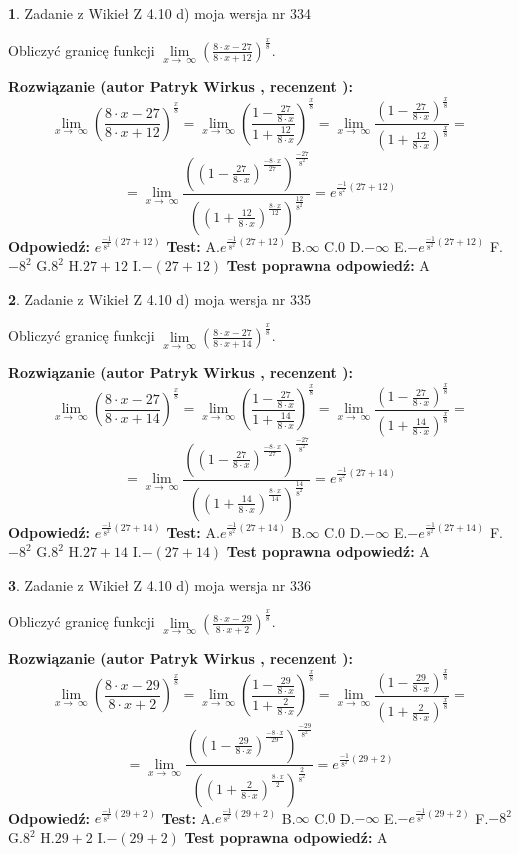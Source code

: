 \documentclass[12pt, a4paper]{article}
\theoremstyle{definition} %
\newtheorem{zad}{}
\newcommand{\zadStart}[1]{\begin{zad}#1\newline}
\newcommand{\zadStop}{\end{zad}}
\newcommand{\rozwStart}[2]{\noindent \textbf{Rozwiązanie (autor #1 , recenzent #2): }\newline}
\newcommand{\rozwStop}{\newline}
\newcommand{\odpStart}{\noindent \textbf{Odpowiedź:}\newline}
\newcommand{\odpStop}{\newline}
\newcommand{\testStart}{\noindent \textbf{Test:}\newline}
\newcommand{\testStop}{\newline}
\newcommand{\kluczStart}{\noindent \textbf{Test poprawna odpowiedź:}\newline}
\newcommand{\kluczStop}{\newline}
\begin{document}
\zadStart{Zadanie z Wikieł Z 4.10 d) moja wersja nr 334}


Obliczyć granicę funkcji  $\lim\limits_{x\to\ \infty}(\frac{8\cdot x-27}{8\cdot x+12})^{\frac{x}{8}}$.
\zadStop
\rozwStart{Patryk Wirkus}{}
$$\lim\limits_{x\to\ \infty}(\frac{8\cdot x-27}{8\cdot x+12})^{\frac{x}{8}} = \lim\limits_{x\to\ \infty}(\frac{1-\frac{27}{8\cdot x}}{1+\frac{12}{8\cdot x}})^{\frac{x}{8}}=\lim\limits_{x\to\ \infty}\frac{(1-\frac{27}{8\cdot x})^{\frac{x}{8}}}{(1+\frac{12}{8\cdot x})^{\frac{x}{8}}}=$$
$$=\lim\limits_{x\to\ \infty}\frac{((1-\frac{27}{8\cdot x})^{\frac{-8\cdot x}{27}})^{\frac{-27}{8^{2}}}}{((1+\frac{12}{8\cdot x})^{\frac{8\cdot x}{12}})^{\frac{12}{8^{2}}}}=e^{\frac{-1}{8^{2}}(27+12)}$$
\rozwStop
\odpStart
$e^{\frac{-1}{8^{2}}(27+12)}$
\odpStop
\testStart
A.$e^{\frac{-1}{8^{2}}(27+12)}$ B.$\infty$ C.$0$ D.$-\infty$ E.$-e^{\frac{-1}{8^{2}}(27+12)}$
F.$-8^{2}$ G.$8^{2}$
H.$27+12$
I.$-(27+12)$
\testStop
\kluczStart
A
\kluczStop



\zadStart{Zadanie z Wikieł Z 4.10 d) moja wersja nr 335}


Obliczyć granicę funkcji  $\lim\limits_{x\to\ \infty}(\frac{8\cdot x-27}{8\cdot x+14})^{\frac{x}{8}}$.
\zadStop
\rozwStart{Patryk Wirkus}{}
$$\lim\limits_{x\to\ \infty}(\frac{8\cdot x-27}{8\cdot x+14})^{\frac{x}{8}} = \lim\limits_{x\to\ \infty}(\frac{1-\frac{27}{8\cdot x}}{1+\frac{14}{8\cdot x}})^{\frac{x}{8}}=\lim\limits_{x\to\ \infty}\frac{(1-\frac{27}{8\cdot x})^{\frac{x}{8}}}{(1+\frac{14}{8\cdot x})^{\frac{x}{8}}}=$$
$$=\lim\limits_{x\to\ \infty}\frac{((1-\frac{27}{8\cdot x})^{\frac{-8\cdot x}{27}})^{\frac{-27}{8^{2}}}}{((1+\frac{14}{8\cdot x})^{\frac{8\cdot x}{14}})^{\frac{14}{8^{2}}}}=e^{\frac{-1}{8^{2}}(27+14)}$$
\rozwStop
\odpStart
$e^{\frac{-1}{8^{2}}(27+14)}$
\odpStop
\testStart
A.$e^{\frac{-1}{8^{2}}(27+14)}$ B.$\infty$ C.$0$ D.$-\infty$ E.$-e^{\frac{-1}{8^{2}}(27+14)}$
F.$-8^{2}$ G.$8^{2}$
H.$27+14$
I.$-(27+14)$
\testStop
\kluczStart
A
\kluczStop



\zadStart{Zadanie z Wikieł Z 4.10 d) moja wersja nr 336}


Obliczyć granicę funkcji  $\lim\limits_{x\to\ \infty}(\frac{8\cdot x-29}{8\cdot x+2})^{\frac{x}{8}}$.
\zadStop
\rozwStart{Patryk Wirkus}{}
$$\lim\limits_{x\to\ \infty}(\frac{8\cdot x-29}{8\cdot x+2})^{\frac{x}{8}} = \lim\limits_{x\to\ \infty}(\frac{1-\frac{29}{8\cdot x}}{1+\frac{2}{8\cdot x}})^{\frac{x}{8}}=\lim\limits_{x\to\ \infty}\frac{(1-\frac{29}{8\cdot x})^{\frac{x}{8}}}{(1+\frac{2}{8\cdot x})^{\frac{x}{8}}}=$$
$$=\lim\limits_{x\to\ \infty}\frac{((1-\frac{29}{8\cdot x})^{\frac{-8\cdot x}{29}})^{\frac{-29}{8^{2}}}}{((1+\frac{2}{8\cdot x})^{\frac{8\cdot x}{2}})^{\frac{2}{8^{2}}}}=e^{\frac{-1}{8^{2}}(29+2)}$$
\rozwStop
\odpStart
$e^{\frac{-1}{8^{2}}(29+2)}$
\odpStop
\testStart
A.$e^{\frac{-1}{8^{2}}(29+2)}$ B.$\infty$ C.$0$ D.$-\infty$ E.$-e^{\frac{-1}{8^{2}}(29+2)}$
F.$-8^{2}$ G.$8^{2}$
H.$29+2$
I.$-(29+2)$
\testStop
\kluczStart
A
\kluczStop
\end{document}
